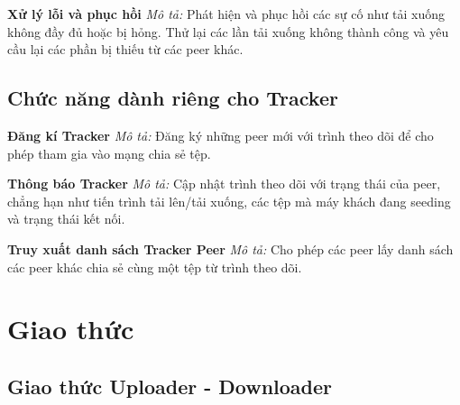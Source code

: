 \documentclass[a4paper]{article}
\begin{document}
    \textbf{Xử lý lỗi và phục hồi}  
    \textit{Mô tả:} Phát hiện và phục hồi các sự cố như tải xuống không đầy đủ hoặc bị hỏng. Thử lại các lần tải xuống không thành công và yêu cầu lại các phần bị thiếu từ các peer khác.  
    

\subsection{Chức năng dành riêng cho Tracker}

    \textbf{Đăng kí Tracker}  
    \textit{Mô tả:} Đăng ký những peer mới với trình theo dõi để cho phép tham gia vào mạng chia sẻ tệp.  
    

    \textbf{Thông báo Tracker}  
    \textit{Mô tả:} Cập nhật trình theo dõi với trạng thái của peer, chẳng hạn như tiến trình tải lên/tải xuống, các tệp mà máy khách đang seeding và trạng thái kết nối.  
    
    \textbf{Truy xuất danh sách Tracker Peer}  
    \textit{Mô tả:} Cho phép các peer lấy danh sách các peer khác chia sẻ cùng một tệp từ trình theo dõi.  
    

\section{Giao thức}

    \subsection{Giao thức Uploader - Downloader}
\end{document}
